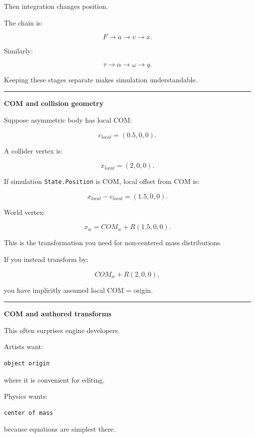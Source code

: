 Then integration changes position.

The chain is:

\[
F
\rightarrow
a
\rightarrow
v
\rightarrow
x.
\]

Similarly:

\[
\tau
\rightarrow
\alpha
\rightarrow
\omega
\rightarrow
q.
\]

Keeping these stages separate makes simulation understandable.

\begin{center}\rule{0.5\linewidth}{0.5pt}\end{center}

\textbf{COM and collision geometry}

Suppose asymmetric body has local COM:

\[
c_{local}=(0.5,0,0).
\]

A collider vertex is:

\[
x_{local}=(2,0,0).
\]

If simulation \texttt{State.Position} is COM, local offset from COM is:

\[
x_{local}-c_{local}
=
(1.5,0,0).
\]

World vertex:

\[
x_w
=
COM_w+
R(1.5,0,0).
\]

This is the transformation you need for non-centered mass distributions.

If you instead transform by:

\[
COM_w+R(2,0,0),
\]

you have implicitly assumed local COM = origin.

\begin{center}\rule{0.5\linewidth}{0.5pt}\end{center}

\textbf{COM and authored transforms}

This often surprises engine developers.

Artists want:

\begin{verbatim}
object origin
\end{verbatim}

where it is convenient for editing.

Physics wants:

\begin{verbatim}
center of mass
\end{verbatim}

because equations are simplest there.

